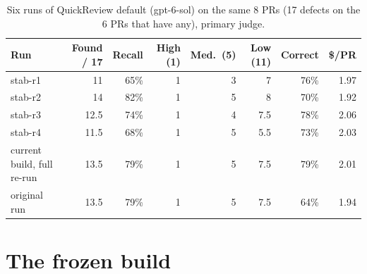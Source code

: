 \documentclass[11pt,a4paper]{article}
\newcommand{\qcr}{QuickReview}
\begin{document}
\begin{table}[!tbp]
  \centering
  \small
  \caption{Six runs of \qcr{} default (gpt-6-sol) on the same 8 PRs (17
  defects on the 6 PRs that have any), primary judge.}
  \label{tab:stab}
  \begin{tabular}{lrrrrrrr}
    \toprule
    Run & Found / 17 & Recall & High (1) & Med.\ (5) & Low (11) & Correct & \$/PR \\
    \midrule
    stab-r1 & 11 & 65\% & 1 & 3 & 7 & 76\% & 1.97 \\
    stab-r2 & 14 & 82\% & 1 & 5 & 8 & 70\% & 1.92 \\
    stab-r3 & 12.5 & 74\% & 1 & 4 & 7.5 & 78\% & 2.06 \\
    stab-r4 & 11.5 & 68\% & 1 & 5 & 5.5 & 73\% & 2.03 \\
    current build, full re-run & 13.5 & 79\% & 1 & 5 & 7.5 & 79\% & 2.01 \\
    original run & 13.5 & 79\% & 1 & 5 & 7.5 & 64\% & 1.94 \\
    \bottomrule
  \end{tabular}
\end{table}

\section{The frozen build}
\label{sec:frozen}
\end{document}
